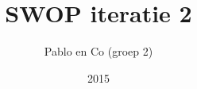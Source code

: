 \documentclass[mathserif,serif]{beamer}
\title{SWOP iteratie 2}
\author{Pablo en Co (groep 2)}
\institute{KU Leuven}
\date{2015}
\begin{document}
  \frame{\titlepage}

  
\end{document}
